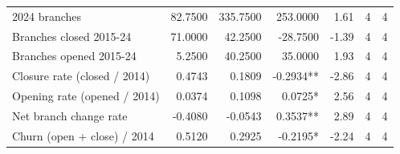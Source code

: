 \begin{tabular}{lrrrrrr}
2024 branches & 82.7500 & 335.7500 & 253.0000 & 1.61 & 4 & 4 \\
Branches closed 2015-24 & 71.0000 & 42.2500 & -28.7500 & -1.39 & 4 & 4 \\
Branches opened 2015-24 & 5.2500 & 40.2500 & 35.0000 & 1.93 & 4 & 4 \\
Closure rate (closed / 2014) & 0.4743 & 0.1809 & -0.2934** & -2.86 & 4 & 4 \\
Opening rate (opened / 2014) & 0.0374 & 0.1098 & 0.0725* & 2.56 & 4 & 4 \\
Net branch change rate & -0.4080 & -0.0543 & 0.3537** & 2.89 & 4 & 4 \\
Churn (open + close) / 2014 & 0.5120 & 0.2925 & -0.2195* & -2.24 & 4 & 4 \\
\bottomrule
\end{tabular}

